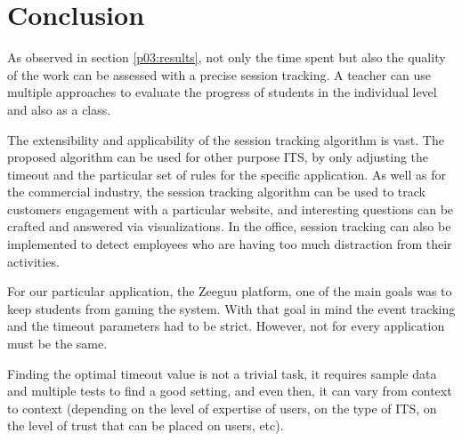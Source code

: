 \chapter{Conclusion}

As observed in section \ref{p03:results}, not only the time spent but also the quality of the work can be assessed with a precise session tracking. A teacher can use multiple approaches to evaluate the progress of students in the individual level and also as a class.

The extensibility and applicability of the session tracking algorithm is vast. The proposed algorithm can be used for other purpose ITS, by only adjusting the timeout and the particular set of rules for the specific application. As well as for the commercial industry, the session tracking algorithm can be used to track customers engagement with a particular website, and interesting questions can be crafted and answered via visualizations. In the office, session tracking can also be implemented to detect employees who are having too much distraction from their activities. 

For our particular application, the Zeeguu platform, one of the main goals was to keep students from gaming the system. With that goal in mind the event tracking and the timeout parameters had to be strict. However, not for every application must be the same.

Finding the optimal timeout value is not a trivial task, it requires sample data and multiple tests to find a good setting, and even then, it can vary from context to context (\Eg depending on the level of expertise of users, on the type of ITS, on the level of trust that can be placed on users, etc).

